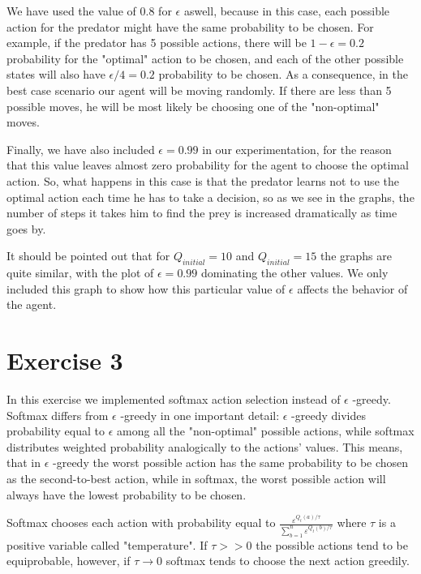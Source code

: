 \documentclass[a4paper,11pt]{article}
\begin{document}
We have used the value of 0.8 for $\epsilon$ aswell, because in this case, each possible action for the predator might have the same probability to be chosen. For example, if the predator has 5 possible actions, there will be $1-\epsilon = 0.2$ probability for the "optimal" action to be chosen, and each of the other possible states will also have $\epsilon /4 = 0.2$ probability to be chosen. As a consequence, in the best case scenario our agent will be moving randomly. If there are less than 5 possible moves, he will be most likely be choosing one of the "non-optimal" moves.


Finally, we have also included $\epsilon = 0.99$ in our experimentation, for the reason that this value leaves almost zero probability for the agent to choose the optimal action. So, what happens in this case is that the predator learns not to use the optimal action each time he has to take a decision, so as we see in the graphs, the number of steps it takes him to find the prey is increased dramatically as time goes by.


It should be pointed out that for $Q_{initial} = 10$ and $Q_{initial} = 15$ the graphs are quite similar, with the plot of $\epsilon = 0.99$ dominating the other values. We only included this graph to show how this particular value of $\epsilon$ affects the behavior of the agent.
\section*{Exercise 3}

In this exercise we implemented softmax action selection instead of $\epsilon$ -greedy. 
Softmax differs from $\epsilon$ -greedy in one important detail: $\epsilon$ -greedy divides probability equal to $\epsilon$ among all the "non-optimal" possible actions, while softmax distributes weighted probability analogically to the actions' values. This means, that in $\epsilon$ -greedy the worst possible action has the same probability to be chosen as the second-to-best action, while in softmax, the worst possible action will always have the lowest probability to be chosen.

Softmax chooses each action with probability equal to $\frac{\varepsilon ^{Q_t(a)/ \tau}}{\sum^n_{b=1}\varepsilon ^{Q_t(b)/ \tau}}$
where $\tau$ is a positive variable called "temperature". If $\tau >> 0$ the possible actions tend to be equiprobable, however, if $\tau \rightarrow 0$ softmax tends to choose the next action greedily.
\end{document}
